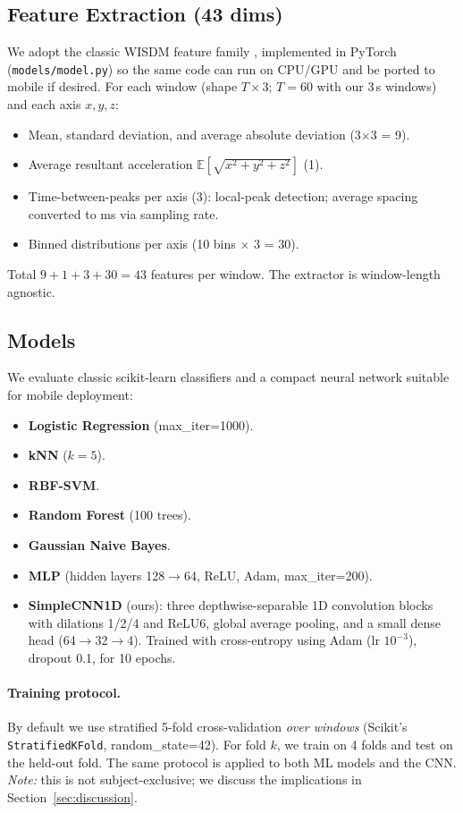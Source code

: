 \documentclass[10pt,twocolumn]{article}
\begin{document}
\subsection{Feature Extraction (43 dims)}
We adopt the classic WISDM feature family \cite{Kwapisz2010}, implemented in PyTorch (\texttt{models/model.py}) so the same code can run on CPU/GPU and be ported to mobile if desired. For each window (shape \(T{\times}3\); \(T{=}60\) with our 3\,s windows) and each axis \(x,y,z\):
\begin{itemize}
  \item Mean, standard deviation, and average absolute deviation (3$\times$3 = 9).
  \item Average resultant acceleration \(\mathbb{E}[\sqrt{x^2+y^2+z^2}]\) (1).
  \item Time-between-peaks per axis (3): local-peak detection; average spacing converted to ms via sampling rate.
  \item Binned distributions per axis (10 bins $\times$ 3 = 30).
\end{itemize}
Total \(9+1+3+30=43\) features per window. The extractor is window-length agnostic.

\subsection{Models}
We evaluate classic scikit-learn classifiers and a compact neural network suitable for mobile deployment:
\begin{itemize}
  \item \textbf{Logistic Regression} (max\_iter=1000).
  \item \textbf{kNN} ($k=5$).
  \item \textbf{RBF-SVM}.
  \item \textbf{Random Forest} (100 trees).
  \item \textbf{Gaussian Naive Bayes}.
  \item \textbf{MLP} (hidden layers 128$\rightarrow$64, ReLU, Adam, max\_iter=200).
  \item \textbf{SimpleCNN1D} (ours): three depthwise-separable 1D convolution blocks with dilations 1/2/4 and ReLU6, global average pooling, and a small dense head (64$\rightarrow$32$\rightarrow$4). Trained with cross-entropy using Adam (lr $10^{-3}$), dropout 0.1, for 10 epochs.
\end{itemize}

\paragraph{Training protocol.} By default we use stratified 5-fold cross-validation \textit{over windows} (Scikit's \texttt{StratifiedKFold}, random\_state=42). For fold \(k\), we train on 4 folds and test on the held-out fold. The same protocol is applied to both ML models and the CNN. \emph{Note:} this is not subject-exclusive; we discuss the implications in Section~\ref{sec:discussion}. 
\end{document}
